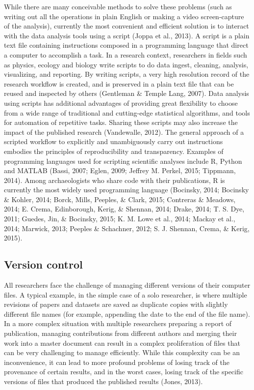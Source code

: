 \documentclass[american,man]{apa6}
\newcounter{author}
\begin{document}
While there are many conceivable methods to solve these problems (such
as writing out all the operations in plain English or making a video
screen-capture of the analysis), currently the most convenient and
efficient solution is to interact with the data analysis tools using a
script (Joppa et al., 2013). A script is a plain text file containing
instructions composed in a programming language that direct a computer
to accomplish a task. In a research context, researchers in fields such
as physics, ecology and biology write scripts to do data ingest,
cleaning, analysis, visualizing, and reporting. By writing scripts, a
very high resolution record of the research workflow is created, and is
preserved in a plain text file that can be reused and inspected by
others (Gentleman \& Temple Lang, 2007). Data analysis using scripts has
additional advantages of providing great flexibility to choose from a
wide range of traditional and cutting-edge statistical algorithms, and
tools for automation of repetitive tasks. Sharing these scripts may also
increase the impact of the published research (Vandewalle, 2012). The
general approach of a scripted workflow to explicitly and unambiguously
carry out instructions embodies the principles of reproducibility and
transparency. Examples of programming languages used for scripting
scientific analyses include R, Python and MATLAB (Bassi, 2007; Eglen,
2009; Jeffrey M. Perkel, 2015; Tippmann, 2014). Among archaeologists who
share code with their publications, R is currently the most widely used
programming language (Bocinsky, 2014; Bocinsky \& Kohler, 2014; Borck,
Mills, Peeples, \& Clark, 2015; Contreras \& Meadows, 2014; E. Crema,
Edinborough, Kerig, \& Shennan, 2014; Drake, 2014; T. S. Dye, 2011;
Guedes, Jin, \& Bocinsky, 2015; K. M. Lowe et al., 2014; Mackay et al.,
2014; Marwick, 2013; Peeples \& Schachner, 2012; S. J. Shennan, Crema,
\& Kerig, 2015).

\subsection{Version control}\label{version-control}

All researchers face the challenge of managing different versions of
their computer files. A typical example, in the simple case of a solo
researcher, is where multiple revisions of papers and datasets are saved
as duplicate copies with slightly different file names (for example,
appending the date to the end of the file name). In a more complex
situation with multiple researchers preparing a report of publication,
managing contributions from different authors and merging their work
into a master document can result in a complex proliferation of files
that can be very challenging to manage efficiently. While this
complexity can be an inconvenience, it can lead to more profound
problems of losing track of the provenance of certain results, and in
the worst cases, losing track of the specific versions of files that
produced the published results (Jones, 2013).
\end{document}
